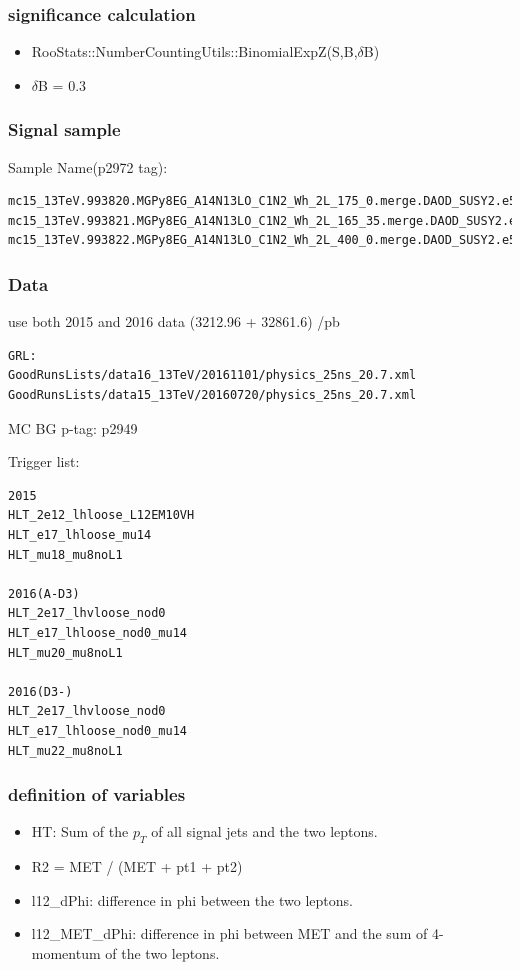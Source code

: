 \documentclass[mathserif,serif]{beamer}
\begin{document}



\begin{frame}
\frametitle{significance calculation}
\begin{itemize}
\item RooStats::NumberCountingUtils::BinomialExpZ(S,B,$\delta$B)
\item $\delta$B = 0.3
\end{itemize}
\end{frame}

\begin{frame}[fragile]
\frametitle{Signal sample}
\small
Sample Name(p2972 tag):
\tiny
\begin{verbatim}
mc15_13TeV.993820.MGPy8EG_A14N13LO_C1N2_Wh_2L_175_0.merge.DAOD_SUSY2.e5678_a766_a821_r7676_p2949_p2972
mc15_13TeV.993821.MGPy8EG_A14N13LO_C1N2_Wh_2L_165_35.merge.DAOD_SUSY2.e5678_a766_a821_r7676_p2949_p2972
mc15_13TeV.993822.MGPy8EG_A14N13LO_C1N2_Wh_2L_400_0.merge.DAOD_SUSY2.e5678_a766_a821_r7676_p2949_p2972
\end{verbatim}
\end{frame}

\begin{frame}[fragile]
\frametitle{Data}
\small
use both 2015 and 2016 data (3212.96 + 32861.6) /pb
\tiny
\begin{verbatim}
GRL:
GoodRunsLists/data16_13TeV/20161101/physics_25ns_20.7.xml
GoodRunsLists/data15_13TeV/20160720/physics_25ns_20.7.xml
\end{verbatim}
\end{frame}

\begin{frame}{MC BG}
p-tag: p2949
\end{frame}

\begin{frame}[fragile]
\small
Trigger list:\\
\scriptsize
\begin{verbatim}
2015
HLT_2e12_lhloose_L12EM10VH
HLT_e17_lhloose_mu14
HLT_mu18_mu8noL1

2016(A-D3)
HLT_2e17_lhvloose_nod0
HLT_e17_lhloose_nod0_mu14
HLT_mu20_mu8noL1

2016(D3-)
HLT_2e17_lhvloose_nod0
HLT_e17_lhloose_nod0_mu14
HLT_mu22_mu8noL1
\end{verbatim}
\end{frame}

\begin{frame}
\frametitle{definition of variables}
\normalsize
\begin{itemize}
\item HT: Sum of the $p_T$ of all signal jets and the two leptons.
\item R2 = MET / (MET + pt1 + pt2)
\item l12\_dPhi: difference in phi between the two leptons.
\item l12\_MET\_dPhi: difference in phi between MET and the sum of 4-momentum of the two leptons.
\end{itemize}
\end{frame}
\end{document}
